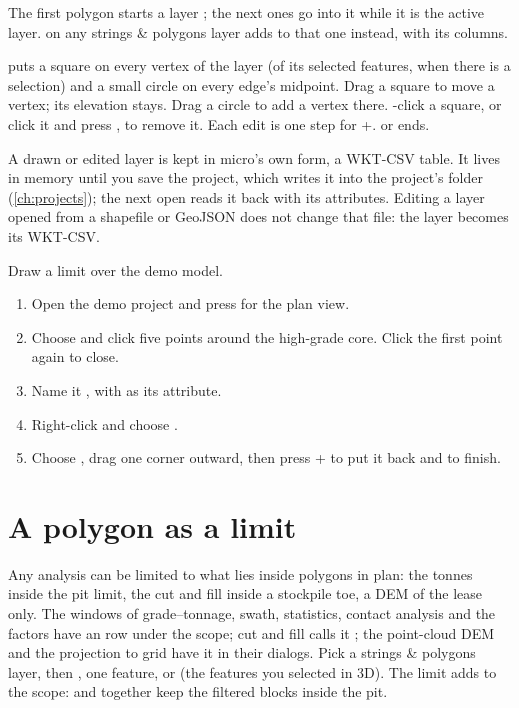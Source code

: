 The first polygon starts a layer ; the next ones go into it while it is the active
layer.  on any strings \& polygons layer adds to that one instead,
with its columns.

 puts a square on every vertex of the layer (of its selected features,
when there is a selection) and a small circle on every edge's midpoint. Drag a square to move a
vertex; its elevation stays. Drag a circle to add a vertex there. -click a square, or click
it and press , to remove it. Each edit is one step for +.  or
 ends.

\begin{note}
A drawn or edited layer is kept in micro's own form, a WKT-CSV table. It lives in memory until you
save the project, which writes it into the project's  folder (\cref{ch:projects});
the next open reads it back with its attributes. Editing a layer opened from a shapefile or GeoJSON
does not change that file: the layer becomes its WKT-CSV.
\end{note}

\begin{tryit}
Draw a limit over the demo model.
\begin{enumerate}
\item Open the demo project and press  for the plan view.
\item Choose  and click five points around the high-grade core. Click the
  first point again to close.
\item Name it , with  as its attribute.
\item Right-click  and choose .
\item Choose , drag one corner outward, then press +
  to put it back and  to finish.
\end{enumerate}
\end{tryit}

\section{A polygon as a limit}\label{sec:polygons-limit}

Any analysis can be limited to what lies inside polygons in plan: the tonnes inside the pit limit,
the cut and fill inside a stockpile toe, a DEM of the lease only. The windows of grade--tonnage,
swath, statistics, contact analysis and the factors have an  row under the scope; cut and
fill calls it ; the point-cloud DEM and the projection to grid have it in their dialogs.
Pick a strings \& polygons layer, then , one feature, or  (the
features you selected in 3D). The limit adds to the scope:  and  together
keep the filtered blocks inside the pit.

